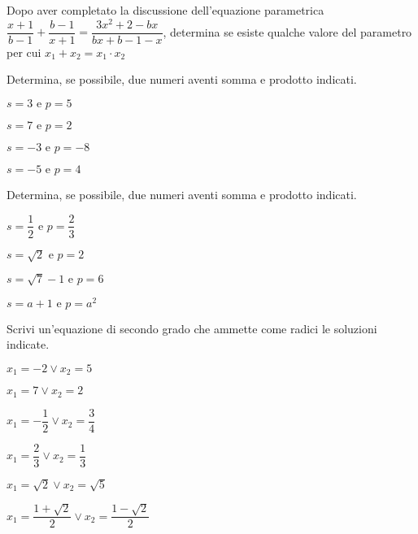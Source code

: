 \begin{esercizio}[*]
 \label{ese:3.76}
Dopo aver completato la discussione dell'equazione parametrica 
\(\dfrac{x + 1}{b-1} + \dfrac{b-1}{x + 1}=
\dfrac{3 x^{2} + 2-b x}{b x + b-1-x}\), 
determina se esiste qualche valore del parametro per cui
\(x_{1} + x_{2} = x_{1} \cdot x_{2}\)
\end{esercizio}

\begin{esercizio}
 \label{ese:3.77}
Determina, se possibile, due numeri aventi somma e prodotto indicati.
\begin{htmulticols}{2}
\begin{enumeratea}
\item\(s = 3 \text{ e } p = 5\)
\item\(s = 7 \text{ e } p = 2\)
\item\(s =-3 \text{ e } p =-8\)
\item\(s =-5 \text{ e } p = 4\)
\end{enumeratea}
\end{htmulticols}
\end{esercizio}

\begin{esercizio}
 \label{ese:3.78}
Determina, se possibile, due numeri aventi somma e prodotto indicati.
\begin{htmulticols}{2}
\begin{enumeratea}
\item\(s = \dfrac{1}{2} \text{ e } p = \dfrac{2}{3}\)
\item\(s = \sqrt{2} \text{ e } p = 2\)
\item\(s = \sqrt{7}-1 \text{ e } p = 6\)
\item\(s = a + 1 \text{ e } p= a^{2}\)
\end{enumeratea}
\end{htmulticols}
\end{esercizio}

\begin{esercizio}
 \label{ese:3.79}
Scrivi un'equazione di secondo grado che ammette come radici le soluzioni 
indicate.
\begin{htmulticols}{2}
\begin{enumeratea}
\item\(x_{1} =-2 \vee x_{2} = 5\)
\item\(x_{1} = 7 \vee x_{2} = 2\)
\item\(x_{1} =-\dfrac{1}{2} \vee x_{2} = \dfrac{3}{4}\)
\item\(x_{1} = \dfrac{2}{3} \vee x_{2} = \dfrac{1}{3}\)
\item\(x_{1} = \sqrt{2} \vee x_{2} = \sqrt{5}\)
\item\(x_{1} = \dfrac{1 + \sqrt{2}}{2} \vee x_{2} = \dfrac{1-\sqrt{2}}{2}\)
\end{enumeratea}
\end{htmulticols}
\end{esercizio}


